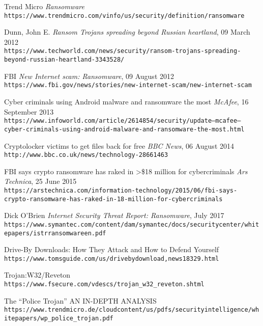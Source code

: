 \documentclass[10pt,a4paper]{article}
\begin{document}
\begin{thebibliography}{1}

Trend Micro
\textit{Ransomware}
\\\texttt{https://www.trendmicro.com/vinfo/us/security/definition/ransomware}

Dunn, John E.
\textit{Ransom Trojans spreading beyond Russian heartland}, 09 March 2012
\\\texttt{https://www.techworld.com/news/security/ransom-trojans-spreading-beyond-russian-heartland-3343528/}

FBI
\textit{New Internet scam: Ransomware}, 09 August 2012
\\\texttt{https://www.fbi.gov/news/stories/new-internet-scam/new-internet-scam}

Cyber criminals using Android malware and ransomware the most
\textit{McAfee}, 16 September 2013
\\\texttt{https://www.infoworld.com/article/2614854/security/update--mcafee--cyber-criminals-using-android-malware-and-ransomware-the-most.html}

Cryptolocker victims to get files back for free
\textit{BBC News}, 06 August 2014
\\\texttt{http://www.bbc.co.uk/news/technology-28661463}

FBI says crypto ransomware has raked in >\$18 million for cybercriminals
\textit{Ars Technica}, 25 June 2015
\\\texttt{https://arstechnica.com/information-technology/2015/06/fbi-says-crypto-ransomware-has-raked-in-18-million-for-cybercriminals}

Dick O’Brien
\textit{Internet Security Threat Report: Ransomware}, July 2017
\\\texttt{https://www.symantec.com/content/dam/symantec/docs/security\-center/white\-papers/istr\-ransomware\-en.pdf}

Drive-By Downloads: How They Attack and How to Defend Yourself
\\\texttt{https://www.tomsguide.com/us/driveby\-download,news\-18329.html}

Trojan:W32/Reveton
\\\texttt{https://www.f\-secure.com/v\-descs/trojan\_w32\_reveton.shtml}

The “Police Trojan”
AN IN-DEPTH ANALYSIS
\\\texttt{https://www.trendmicro.de/cloud\-content/us/pdfs/security\-intelligence/white\-papers/wp\_police\_trojan.pdf}


\end{thebibliography}
\end{document}
